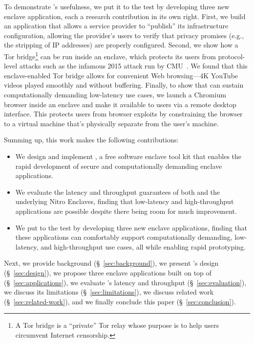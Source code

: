 To demonstrate \tool{}'s usefulness, we put it to the test by developing three
new enclave application, each a research contribution in its own right.
%
First, we build an application that allows a service provider to ``publish'' its
infrastructure configuration, allowing the provider's users to verify that
privacy promises (e.g., the stripping of IP addresses) are properly configured.
%
Second, we show how a Tor bridge\footnote{A Tor bridge is a ``private'' Tor
relay whose purpose is to help users circumvent Internet censorship.}
can be run inside an enclave, which protects its users from protocol-level
attacks such as the infamous 2015 attack run by CMU~\cite{Dingledine2015a}.
We found that this enclave-enabled Tor bridge allows for convenient Web
browsing---4K YouTube videos played smoothly and without buffering.
%
Finally, to show that \tool{} can sustain computationally demanding low-latency
use cases, we launch a Chromium browser inside an enclave and make it available
to users via a remote desktop interface.  This protects users from browser
exploits by constraining the browser to a virtual machine that's physically
separate from the user's machine.

Summing up, this work makes the following contributions:

\begin{itemize}

  \item We design and implement \emph{\tool{}}, a free software enclave tool kit
    that enables the rapid development of secure and computationally demanding
    enclave applications.

  \item We evaluate the latency and throughput guarantees of both \tool{} and
    the underlying Nitro Enclaves, finding that low-latency and high-throughput
    applications are possible despite there being room for much improvement.

  \item We put \tool{} to the test by developing three new enclave applications,
    finding that these applications can comfortably support computationally
    demanding, low-latency, and high-throughput use cases, all while enabling
    rapid prototyping.

\end{itemize}

Next, we provide background (\S~\ref{sec:background}), we present \tool{}'s design
(\S~\ref{sec:design}), we propose three enclave applications built on top of
\tool{} (\S~\ref{sec:applications}), we evaluate \tool{}'s latency and
throughput (\S~\ref{sec:evaluation}), we discuss its limitations
(\S~\ref{sec:limitations}), we discuss related work (\S~\ref{sec:related-work}),
and we finally conclude this paper (\S~\ref{sec:conclusion}).

